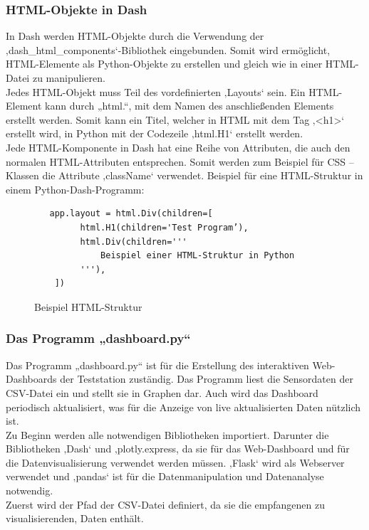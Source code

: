 \subsubsection{HTML-Objekte in Dash}
In Dash werden HTML-Objekte durch die Verwendung der ‚dash\_html\_components‘-Bibliothek eingebunden. Somit wird ermöglicht, HTML-Elemente als Python-Objekte zu erstellen und gleich wie in einer HTML-Datei zu manipulieren. \\
\vspace{3mm}
Jedes HTML-Objekt muss Teil des vordefinierten ‚Layouts‘ sein. Ein HTML-Element kann durch „html.“, mit dem Namen des anschließenden Elements erstellt werden. Somit kann ein Titel, welcher in HTML mit dem Tag  ‚<h1>‘  erstellt wird, in Python mit der Codezeile ‚html.H1‘ erstellt werden. \\
\vspace{3mm}
Jede HTML-Komponente in Dash hat eine Reihe von Attributen, die auch den normalen HTML-Attributen entsprechen. Somit werden zum Beispiel für CSS – Klassen die Attribute ‚className‘ verwendet.
\vspace{3mm}
Beispiel für eine HTML-Struktur in einem Python-Dash-Programm: 
\begin{figure}[H]
    \centering
    \begin{verbatim}
   app.layout = html.Div(children=[
   		 html.H1(children='Test Program’),
   		 html.Div(children='''
       		 Beispiel einer HTML-Struktur in Python 
   		 '''),
	])

    \end{verbatim}
    \caption{Beispiel HTML-Struktur}
\end{figure}

\subsubsection{Das Programm „dashboard.py“}
Das Programm „dashboard.py“ ist für die Erstellung des interaktiven Web-Dashboards der Teststation zuständig. Das Programm liest die Sensordaten der CSV-Datei ein und stellt sie in Graphen dar. Auch wird das Dashboard periodisch aktualisiert, was für die Anzeige von live aktualisierten Daten nützlich ist.\\
\vspace{3mm}
Zu Beginn werden alle notwendigen Bibliotheken importiert. Darunter die Bibliotheken ‚Dash‘ und ‚plotly.express, da sie für das Web-Dashboard und für die Datenvisualisierung verwendet werden müssen. ‚Flask‘ wird als Webserver verwendet  und ‚pandas‘ ist für die Datenmanipulation und Datenanalyse notwendig. \\
\vspace{3mm}
Zuerst wird der Pfad der CSV-Datei definiert, da sie die empfangenen zu visualisierenden, Daten enthält.


